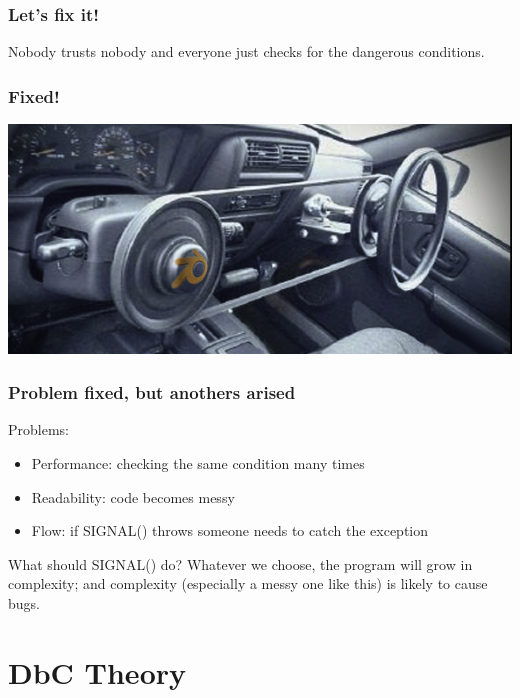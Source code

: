 \documentclass{beamer}
\begin{document}
\begin{frame}
\frametitle{Let's fix it!}

\pause
\begin{block}{}
Nobody trusts nobody and everyone just checks for the dangerous conditions.
\end{block}
\end{frame}

\begin{frame}
\frametitle{Fixed!}
\begin{center}
\includegraphics[scale=0.55]{steering_wheel}
\end{center}
\end{frame}

\begin{frame}
\frametitle{Problem fixed, but anothers arised}
Problems:
\begin{itemize}[<+->]
  \item Performance: checking the same condition many times
  \item Readability: code becomes messy
  \item Flow: if SIGNAL() throws someone needs to catch the exception
\end{itemize}
\pause
\begin{block}{What should SIGNAL() do?}
\pause
Whatever we choose, the program will grow in complexity; and complexity (especially a messy one like this) is likely to cause bugs.
\end{block}
\end{frame}



\section{DbC Theory}
\begin{frame}
\sectionpage
\end{frame}
\end{document}
